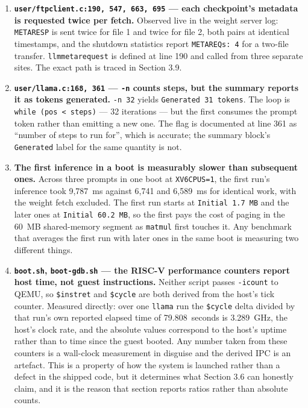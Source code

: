 \documentclass[11pt]{article}
\renewcommand{\_}{\origunderscore\allowbreak}
\begin{document}
\begin{enumerate}[leftmargin=1.4cm, itemsep=8pt, start=7]

\item \textbf{\texttt{user/ftpclient.c:190, 547, 663, 695} --- each checkpoint's metadata is requested twice per fetch.} Observed live in the weight server log: \texttt{META\_RESP} is sent twice for file 1 and twice for file 2, both pairs at identical timestamps, and the shutdown statistics report \texttt{META\_REQs: 4} for a two-file transfer. \texttt{llm\_meta\_request} is defined at line 190 and called from three separate sites. The exact path is traced in Section 3.9.

\item \textbf{\texttt{user/llama.c:168, 361} --- \texttt{-n} counts steps, but the summary reports it as tokens generated.} \texttt{-n 32} yields \texttt{Generated 31 tokens}. The loop is \texttt{while (pos < steps)} --- 32 iterations --- but the first consumes the prompt token rather than emitting a new one. The flag is documented at line 361 as ``number of steps to run for'', which is accurate; the summary block's \texttt{Generated} label for the same quantity is not.

\item \textbf{The first inference in a boot is measurably slower than subsequent ones.} Across three prompts in one boot at \texttt{XV6\_CPUS=1}, the first run's inference took 9{,}787~ms against 6{,}741 and 6{,}589~ms for identical work, with the weight fetch excluded. The first run starts at \texttt{Initial 1.7 MB} and the later ones at \texttt{Initial 60.2 MB}, so the first pays the cost of paging in the 60~MB shared-memory segment as \texttt{matmul} first touches it. Any benchmark that averages the first run with later ones in the same boot is measuring two different things.


\item \textbf{\texttt{boot.sh}, \texttt{boot-gdb.sh} --- the RISC-V performance counters report host time, not guest instructions.} Neither script passes \texttt{-icount} to QEMU, so \texttt{\$instret} and \texttt{\$cycle} are both derived from the host's tick counter. Measured directly: over one \texttt{llama} run the \texttt{\$cycle} delta divided by that run's own reported elapsed time of 79.808~seconds is 3.289~GHz, the host's clock rate, and the absolute values correspond to the host's uptime rather than to time since the guest booted. Any number taken from these counters is a wall-clock measurement in disguise and the derived IPC is an artefact. This is a property of how the system is launched rather than a defect in the shipped code, but it determines what Section 3.6 can honestly claim, and it is the reason that section reports ratios rather than absolute counts.
\end{enumerate}
\end{document}
